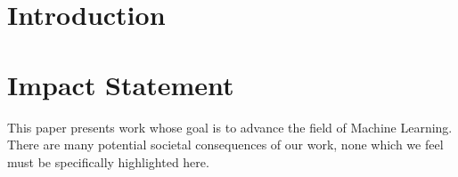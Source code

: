 \documentclass{article}
\begin{document}

\printAffiliationsAndNotice{}

\begin{abstract}
One paragraph, 4--6 sentences.
\end{abstract}

\section{Introduction}

\section{Impact Statement}
This paper presents work whose goal is to advance the field of Machine Learning.
There are many potential societal consequences of our work, none which we feel must be specifically highlighted here.





\end{document}
